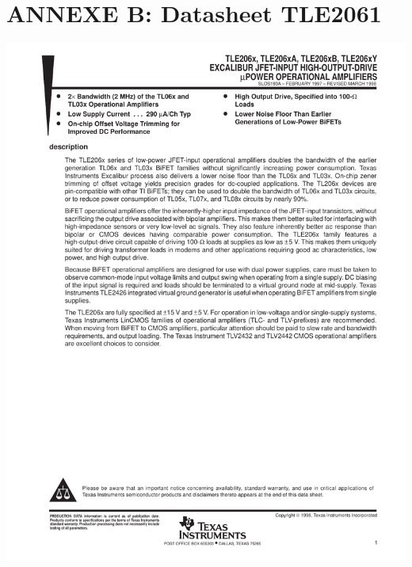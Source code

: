 \section*{ANNEXE B: Datasheet TLE2061}
\vspace{-0.1cm}
\label{DatasheetCA3140}
\begin{center}
\includegraphics[scale=0.8, page=2]{tle2061.pdf}
\newpage

\end{center}
